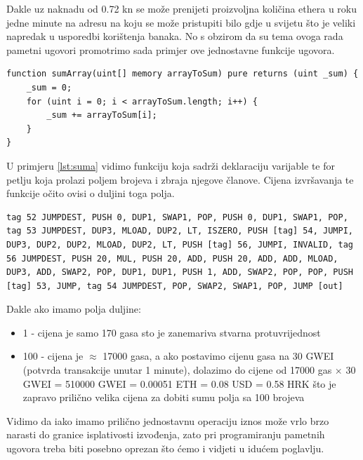 \documentclass[a4paper,oneside,12pt]{memoir} %
\begin{document}
Dakle uz naknadu od 0.72 kn se može prenijeti proizvoljna količina ethera u roku jedne minute na adresu na koju se može pristupiti bilo gdje u svijetu što je veliki napredak u usporedbi korištenja banaka. No s obzirom da su tema ovoga rada pametni ugovori promotrimo sada primjer ove jednostavne funkcije ugovora.  

\begin{minipage}{\linewidth}
\begin{lstlisting}[caption = Primjer 1, language=solidity, label={lst:suma}]
function sumArray(uint[] memory arrayToSum) pure returns (uint _sum) {
    _sum = 0;
    for (uint i = 0; i < arrayToSum.length; i++) {
        _sum += arrayToSum[i];
    }
}
\end{lstlisting}
\end{minipage}

U primjeru \ref{lst:suma} vidimo funkciju koja sadrži deklaraciju varijable te for petlju koja prolazi poljem brojeva i zbraja njegove članove. Cijena izvršavanja te funkcije očito ovisi o duljini toga polja.

\begin{lstlisting}[language={[x86masm]Assembler}, caption=Assembly program od funkcije iz primjera \ref{lst:suma}]
tag 52 JUMPDEST, PUSH 0, DUP1, SWAP1, POP, PUSH 0, DUP1, SWAP1, POP, tag 53 JUMPDEST, DUP3, MLOAD, DUP2, LT, ISZERO, PUSH [tag] 54, JUMPI, DUP3, DUP2, DUP2, MLOAD, DUP2, LT, PUSH [tag] 56, JUMPI, INVALID, tag 56 JUMPDEST, PUSH 20, MUL, PUSH 20, ADD, PUSH 20, ADD, ADD, MLOAD, DUP3, ADD, SWAP2, POP, DUP1, DUP1, PUSH 1, ADD, SWAP2, POP, POP, PUSH [tag] 53, JUMP, tag 54 JUMPDEST, POP, SWAP2, SWAP1, POP, JUMP [out]   
\end{lstlisting}

Dakle ako imamo polja duljine: 

\begin{itemize}
    \item 1 - cijena je samo 170 gasa sto je zanemariva stvarna protuvrijednost
    \item 100 - cijena je $\approx$ 17000 gasa, a ako postavimo cijenu gasa na 30 GWEI (potvrda transakcije unutar 1 minute), dolazimo do cijene od 17000 gas $\times$ 30 GWEI = 510000 GWEI = 0.00051 ETH = 0.08 USD = 0.58 HRK što je zapravo prilično velika cijena za dobiti sumu polja sa 100 brojeva
\end{itemize}

Vidimo da iako imamo prilično jednostavnu operaciju iznos može vrlo brzo narasti do granice isplativosti izvođenja, zato pri programiranju pametnih ugovora treba biti posebno oprezan što ćemo i vidjeti u idućem poglavlju.
\end{document}
